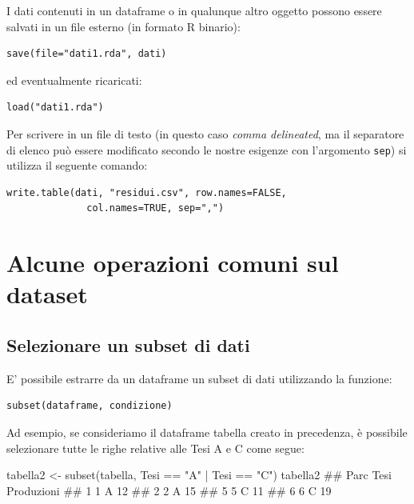 \documentclass[a4paper,12pt,oneside]{book}
\newenvironment{Shaded}{}{}
\newcommand{\KeywordTok}[1]{#1}
\newcommand{\StringTok}[1]{#1}
\newcommand{\CommentTok}[1]{#1}
\newcommand{\OperatorTok}[1]{#1}
\newcommand{\NormalTok}[1]{#1}
\begin{document}
I dati contenuti in un dataframe o in qualunque altro oggetto possono essere salvati in un file esterno (in formato R binario):

\begin{verbatim}
save(file="dati1.rda", dati)
\end{verbatim}

ed eventualmente ricaricati:

\begin{verbatim}
load("dati1.rda")
\end{verbatim}

Per scrivere in un file di testo (in questo caso \emph{comma delineated}, ma il separatore di elenco può essere modificato secondo le nostre esigenze con l'argomento \texttt{sep}) si utilizza il seguente comando:

\begin{verbatim}
write.table(dati, "residui.csv", row.names=FALSE, 
              col.names=TRUE, sep=",")
\end{verbatim}

\hypertarget{alcune-operazioni-comuni-sul-dataset}{%
\section*{Alcune operazioni comuni sul dataset}\label{alcune-operazioni-comuni-sul-dataset}}

\hypertarget{selezionare-un-subset-di-dati}{%
\subsection*{Selezionare un subset di dati}\label{selezionare-un-subset-di-dati}}

E' possibile estrarre da un dataframe un subset di dati utilizzando la funzione:

\begin{verbatim}
subset(dataframe, condizione)
\end{verbatim}

Ad esempio, se consideriamo il dataframe tabella creato in precedenza, è possibile selezionare tutte le righe relative alle Tesi A e C come segue:

\begin{Shaded}
\begin{Highlighting}[]
\NormalTok{tabella2  <-}\StringTok{  }\KeywordTok{subset}\NormalTok{(tabella, Tesi }\OperatorTok{==}\StringTok{ "A"} \OperatorTok{|}\StringTok{ }\NormalTok{Tesi }\OperatorTok{==}\StringTok{ "C"}\NormalTok{)}
\NormalTok{tabella2}
\CommentTok{##   Parc Tesi Produzioni}
\CommentTok{## 1    1    A         12}
\CommentTok{## 2    2    A         15}
\CommentTok{## 5    5    C         11}
\CommentTok{## 6    6    C         19}
\end{Highlighting}
\end{Shaded}
\end{document}
